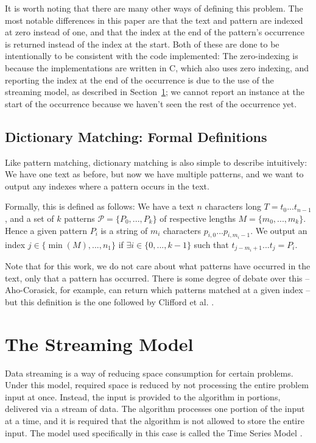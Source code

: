 \documentclass[ %
                    author={Dominic Joseph Moylett},
                    degree={MEng},
                     title={Dictionary Matching with Fingerprints},
                  subtitle={An Empirical Analysis},
                      type={research},
                      year={2015} ]{dissertation}
\begin{document}
It is worth noting that there are many other ways of defining this problem. The most notable differences in this paper are that the text and pattern are indexed at zero instead of one, and that the index at the end of the pattern's occurrence is returned instead of the index at the start. Both of these are done to be intentionally to be consistent with the code implemented: The zero-indexing is because the implementations are written in C, which also uses zero indexing, and reporting the index at the end of the occurrence is due to the use of the streaming model, as described in Section~\ref{sec:streaming-model}; we cannot report an instance at the start of the occurrence because we haven't seen the rest of the occurrence yet.

\subsection{Dictionary Matching: Formal Definitions}
\label{ssec:dict-matching:definitions}

Like pattern matching, dictionary matching is also simple to describe intuitively: We have one text as before, but now we have multiple patterns, and we want to output any indexes where a pattern occurs in the text.

Formally, this is defined as follows: We have a text $n$ characters long $T = t_0...t_{n-1}$, and a set of $k$ patterns $\mathcal{P} = \{P_0,...,P_k\}$ of respective lengths $M = \{m_0,...,m_k\}$. Hence a given pattern $P_i$ is a string of $m_i$ characters $p_{i,0}...p_{i,m_i-1}$. We output an index $j \in \{\min(M),...,n_1\}$ if $\exists i \in \{0,...,k-1\}$ such that $t_{j-m_i+1}...t_{j} = P_i$.

Note that for this work, we do not care about what patterns have occurred in the text, only that a pattern has occurred. There is some degree of debate over this -- Aho-Corasick, for example, can return which patterns matched at a given index -- but this definition is the one followed by Clifford et al. \cite{2015arXiv150406242C}.

\section{The Streaming Model}
\label{sec:streaming-model}

Data streaming \cite{TCS-002} is a way of reducing space consumption for certain problems. Under this model, required space is reduced by not processing the entire problem input at once. Instead, the input is provided to the algorithm in portions, delivered via a stream of data. The algorithm processes one portion of the input at a time, and it is required that the algorithm is not allowed to store the entire input. The model used specifically in this case is called the Time Series Model \cite{TCS-002}.
\end{document}
